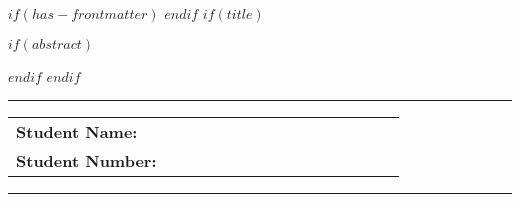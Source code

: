 $if(has-frontmatter)$
\frontmatter
$endif$
$if(title)$
\maketitle
$if(abstract)$
\begin{abstract}
$abstract$
\end{abstract}
$endif$
$endif$

\hrule

\begin{table}[!h]
{\def\arraystretch{1.5}\tabcolsep=0pt
\begin{tabular}{p{0.4\linewidth}p{0.6\linewidth}}
  \textbf{Student Name:} &  \\
  \textbf{Student Number:} & \\ 
\end{tabular}%
}
\end{table}

\hrule
